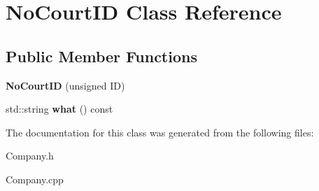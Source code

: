 \hypertarget{class_no_court_i_d}{}\section{No\+Court\+ID Class Reference}
\label{class_no_court_i_d}
\subsection*{Public Member Functions}
\begin{DoxyCompactItemize}
\item 
\mbox{\label{class_no_court_i_d_a2552f160412cb211570faee6567dcd40}} 
{\bfseries No\+Court\+ID} (unsigned ID)
\item 
\mbox{\label{class_no_court_i_d_a0ccd0b5e83d1ca41b3598bf778f1712f}} 
std\+::string {\bfseries what} () const
\end{DoxyCompactItemize}


The documentation for this class was generated from the following files\+:\begin{DoxyCompactItemize}
\item 
Company.\+h\item 
Company.\+cpp\end{DoxyCompactItemize}
